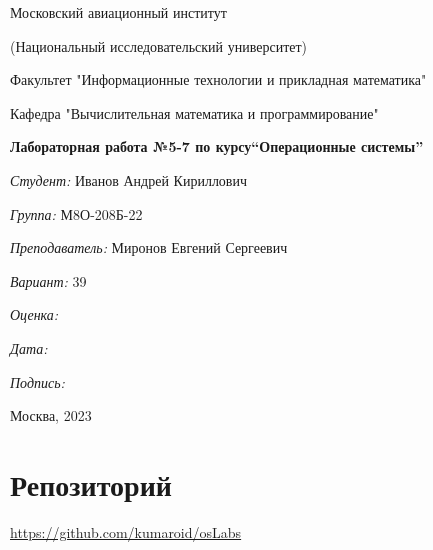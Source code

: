\documentclass[a4paper, 12pt]{article}
\begin{document}
\thispagestyle{empty}	
\begin{center}
	Московский авиационный институт
	
	(Национальный исследовательский университет)
	
	Факультет "Информационные технологии и прикладная математика"
	
	Кафедра "Вычислительная математика и программирование"
	
\end{center}
\vspace{40ex}
\begin{center}
	\textbf{\large{Лабораторная работа №5-7 по курсу\linebreak \textquotedblleft Операционные системы\textquotedblright}}
\end{center}
\vspace{35ex}
\begin{flushright}
	\textit{Студент: } Иванов Андрей Кириллович
	
	\vspace{2ex}
	\textit{Группа: } М8О-208Б-22
	
	\vspace{2ex}
	\textit{Преподаватель: } Миронов Евгений Сергеевич
	
	\vspace{2ex}
	\textit{Вариант: } 39
	
	\vspace{2ex}
	\textit{Оценка: } \underline{\quad\quad\quad\quad\quad\quad}
	
	 \vspace{2ex}
	\textit{Дата: } \underline{\quad\quad\quad\quad\quad\quad}
	
	\vspace{2ex}
	\textit{Подпись: } \underline{\quad\quad\quad\quad\quad\quad}
	
\end{flushright}

\vspace{5ex}

\begin{vfill}
	\begin{center}
		Москва, 2023
	\end{center}	
\end{vfill}
\newpage

\begingroup
\color{black}
\tableofcontents\newpage
\endgroup

\section{Репозиторий}
\href{https://github.com/kumaroid/osLabs}{https://github.com/kumaroid/osLabs}
\end{document}
